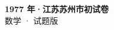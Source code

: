 \documentclass[zihao=-4, a4paper]{ctexart}
\begin{document}
\begin{center}
  {\Large\bfseries 1977 年·江苏苏州市初试卷}\\[4pt]
  {\large 数学 · 试题版}
\end{center}
\medskip
{}

\end{document}
